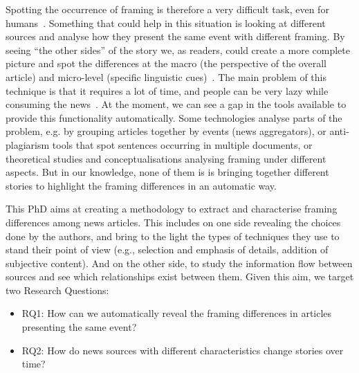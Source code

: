 Spotting the occurrence of framing is therefore a very difficult task, even for humans~\cite{morstatter2018identifying}. Something that could help in this situation is looking at different sources and analyse how they present the same event with different framing.
By seeing ``the other sides'' of the story we, as readers, could create a more complete picture and spot the differences at the macro (the perspective of the overall article) and micro-level (specific linguistic cues)~\cite{gamson1989media}.
The main problem of this technique is that it requires a lot of time,
and people can be very lazy while consuming the news~\cite{pennycook2019lazy}.
At the moment, we can see a gap in the tools available to provide this functionality automatically.
Some technologies analyse parts of the problem, e.g. by grouping articles together by events (news aggregators), or anti-plagiarism tools that spot sentences occurring in multiple documents, or theoretical studies and conceptualisations analysing framing under different aspects.
But in our knowledge, none of them is is bringing together different stories to highlight the framing differences in an automatic way.



This PhD aims at creating a methodology to extract and characterise framing differences among news articles.
This includes on one side revealing the choices done by the authors, and bring to the light the types of techniques they use to stand their point of view (e.g., selection and emphasis of details, addition of subjective content).
And on the other side, to study the information flow between sources and see which relationships exist between them. %
Given this aim, we target two Research Questions:

\begin{itemize}
    \item RQ1: How can we automatically reveal the framing differences in articles presenting the same event?
    \item RQ2: How do news sources with different characteristics change stories over time?
\end{itemize}

